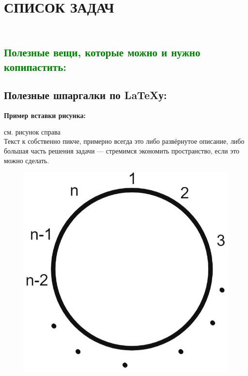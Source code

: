 \documentclass[12pt]{article}
\newcommand{\mode}[1]{
\ifstrequal{#1}{0}{\togglefalse{ifsolved}\togglefalse{needhelp}}{\ifstrequal{#1}{1}{\togglefalse{ifsolved}\toggletrue{needhelp}}{\ifstrequal{#1}{2}{\toggletrue{ifsolved}\togglefalse{needhelp}}{\toggletrue{ifsolved}\toggletrue{needhelp}}}}} %
\begin{document}
\large
\mode{7}

{\centering\section*{СПИСОК ЗАДАЧ}}

{\centering\subsection*{\smallskip\\\textcolor{green}{\textbf{Полезные вещи, которые можно и нужно копипастить:}}}}

\subsection*{\textcolor{Emerald}{\textbf{Полезные шпаргалки по LaTeXу:}}}

\textbf{Пример вставки рисунка:}

\begin{minipage}{\linewidth}
    \begin{minipage}{0.54\linewidth}
    см. рисунок справа\\
    Текст к собственно пикче, примерно всегда это либо развёрнутое описание, либо большая часть решения задачи --- стремимся экономить пространство, если это можно сделать.
    \end{minipage}
    \hspace{0.05\linewidth}
    \begin{minipage}{0.4\linewidth}
    \begin{figure}[H] \includegraphics[width=\linewidth]{sol3} %
    \end{figure}
    \end{minipage}
\end{minipage}
\end{document}
